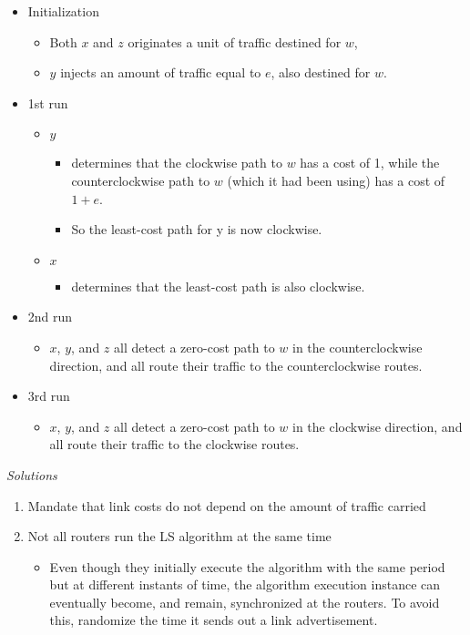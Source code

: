 \documentclass[a4paper]{article}
\begin{document}
\newpage
\begin{itemize}
    \item Initialization
    \begin{itemize}[label=$\circ$]
        \item Both $x$ and $z$ originates a unit of traffic destined for $w$,
        \item $y$ injects an amount of traffic equal to $e$, also destined for $w$.
    \end{itemize}
    \item 1st run
    \begin{itemize}[label=$\circ$]
        \item $y$
        \begin{itemize}[label=\tiny$\blacksquare$]
            \item determines that the clockwise path to $w$ has a cost of 1, while the counterclockwise path to $w$ (which it had been using) has a cost of $1 + e$.
            \item So the least-cost path for y is now clockwise.
        \end{itemize}
        \item $x$
        \begin{itemize}
            \item determines that the least-cost path is also clockwise.
        \end{itemize}
    \end{itemize}
    \item 2nd run
    \begin{itemize}[label=$\circ$]
        \item $x$, $y$, and $z$ all detect a zero-cost path to $w$ in the counterclockwise direction, and all route their traffic to the counterclockwise routes.
    \end{itemize}
    \item 3rd run
    \begin{itemize}[label=$\circ$]
        \item $x$, $y$, and $z$ all detect a zero-cost path to $w$ in the clockwise direction, and all route their traffic to the clockwise routes.
    \end{itemize}
\end{itemize}

\medskip

\noindent\textit{Solutions}
\begin{enumerate}
    \item Mandate that link costs do not depend on the amount of traffic carried
    \item Not all routers run the LS algorithm at the same time
    \begin{itemize}[label=$\circ$]
        \item Even though they initially execute the algorithm with the same period but at different instants of time, the algorithm execution instance can eventually become, and remain, synchronized at the routers. To avoid this, randomize the time it sends out a link advertisement.
    \end{itemize}
\end{enumerate}
\end{document}
